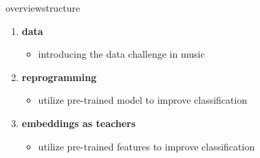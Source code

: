 \begin{frame}{overview}{structure}
		\begin{enumerate}
				\bigskip
				\item   \textbf{data} 
						\begin{itemize}
								\item   introducing the data challenge in music
						\end{itemize}
				\bigskip
				\item   \textbf{reprogramming} 
						\begin{itemize}
								\item   utilize pre-trained model to improve classification
						\end{itemize}
				\bigskip
				\item   \textbf{embeddings as teachers}
						\begin{itemize}
								\item   utilize pre-trained features to improve classification
						\end{itemize}
		\end{enumerate}
\end{frame}
